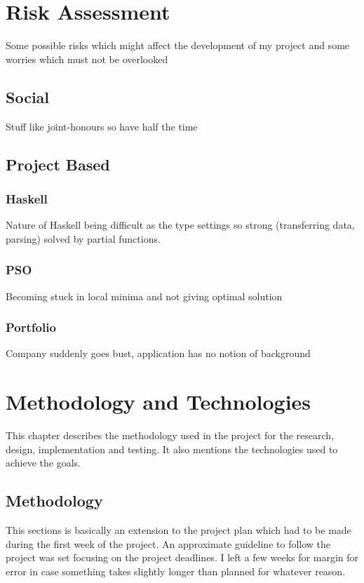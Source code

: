 \documentclass{pdfmx4020}
\begin{document}

\chapter{Risk Assessment}
Some possible risks which might affect the development of my project and some worries which must not be overlooked

  \section{Social} %
  \label{sec:social}
    Stuff like joint-honours so have half the time
  \section{Project Based} %
  \label{sec:project_based}
    \subsection{Haskell} %
    \label{sub:haskell}
      Nature of Haskell being difficult as the type settings so strong (transferring data, parsing) solved by partial functions.
    \subsection{PSO} %
    \label{sub:pso}
      Becoming stuck in local minima and not giving optimal solution
    \subsection{Portfolio} %
    \label{sub:portfolio}
      Company suddenly goes bust, application has no notion of background 


\chapter{Methodology and Technologies}
  This chapter describes the methodology used in the project for the research, design, implementation and testing. It also mentions the technologies used to achieve the goals. 
  \section{Methodology} %
  \label{sec:methodology}
  This sections is basically an extension to the project plan which had to be made during the first week of the project. An approximate guideline to follow the project was set focusing on the project deadlines. I left a few weeks for margin for error in case something takes slightly longer than planned for whatever reason. 
\end{document}
